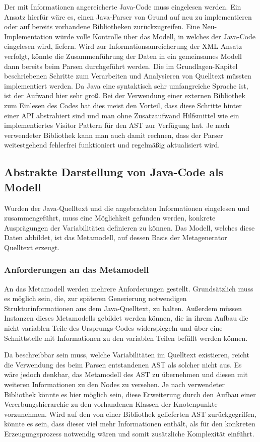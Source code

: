 \documentclass[12pt,oneside,a4paper,parskip]{scrbook}
\begin{document}
Der mit Informationen angereicherte Java-Code muss eingelesen werden. Ein Ansatz hierfür wäre es, einen Java-Parser von Grund auf neu zu implementieren oder auf bereits vorhandene Bibliotheken zurückzugreifen. Eine Neu-Implementation würde volle Kontrolle über das Modell, in welches der Java-Code eingelesen wird, liefern. Wird zur Informationsanreicherung der XML Ansatz verfolgt, könnte die Zusammenführung der Daten in ein gemeinsames Modell dann bereits beim Parsen durchgeführt werden. Die im Grundlagen-Kapitel beschriebenen Schritte zum Verarbeiten und Analysieren von Quelltext müssten implementiert werden. Da Java eine syntaktisch sehr umfangreiche Sprache ist, ist der Aufwand hier sehr groß. Bei der Verwendung einer externen Bibliothek zum Einlesen des Codes hat dies meist den Vorteil, dass diese Schritte hinter einer API abstrahiert sind und man ohne Zusatzaufwand Hilfsmittel wie ein implementiertes Visitor Pattern für den AST zur Verfügung hat. Je nach verwendeter Bibliothek kann man auch damit rechnen, dass der Parser weitestgehend fehlerfrei funktioniert und regelmäßig aktualisiert wird.

\subsection{Abstrakte Darstellung von Java-Code als Modell}\label{sec:codeasmodel}

Wurden der Java-Quelltext und die angebrachten Informationen eingelesen und zusammengeführt, muss eine Möglichkeit gefunden werden, konkrete Ausprägungen der Variabilitäten definieren zu können. Das Modell, welches diese Daten abbildet, ist das Metamodell, auf dessen Basis der Metagenerator Quelltext erzeugt.

\subsubsection{Anforderungen an das Metamodell}

An das Metamodell werden mehrere Anforderungen gestellt. Grundsätzlich muss es möglich sein, die, zur späteren Generierung notwendigen Strukturinformationen aus dem Java-Quelltext, zu halten. Außerdem müssen Instanzen dieses Metamodells gebildet werden können, die in ihrem Aufbau die nicht variablen Teile des Ursprungs-Codes widerspiegeln und über eine Schnittstelle mit Informationen zu den variablen Teilen befüllt werden können.

Da beschreibbar sein muss, welche Variabilitäten im Quelltext existieren, reicht die Verwendung des beim Parsen entstandenen AST als solcher nicht aus. Es wäre jedoch denkbar, das Metamodell des AST zu übernehmen und diesen mit weiteren Informationen zu den Nodes zu versehen. Je nach verwendeter Bibliothek könnte es hier möglich sein, diese Erweiterung durch den Aufbau einer Vererbungshierarchie zu den vorhandenen Klassen der Knotenpunkte vorzunehmen. Wird auf den von einer Bibliothek gelieferten AST zurückgegriffen, könnte es sein, dass dieser viel mehr Informationen enthält, als für den konkreten Erzeugungsprozess notwendig wären und somit zusätzliche Komplexität einführt.
\end{document}
